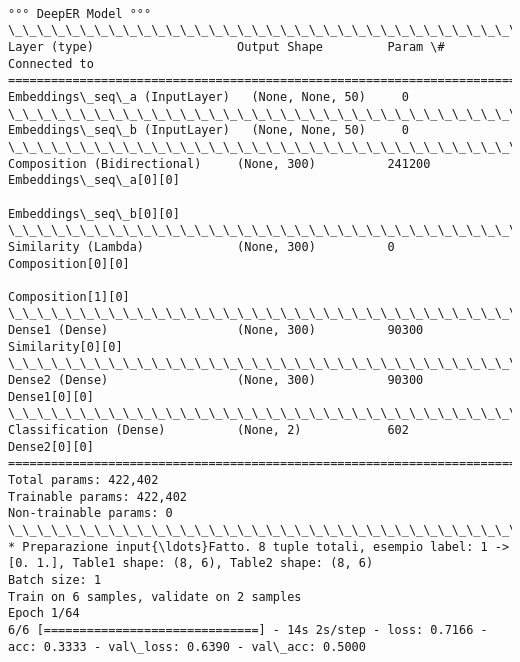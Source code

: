 \documentclass[11pt]{article}
\begin{document}
    \begin{Verbatim}[commandchars=\\\{\}]

°°° DeepER Model °°°
\_\_\_\_\_\_\_\_\_\_\_\_\_\_\_\_\_\_\_\_\_\_\_\_\_\_\_\_\_\_\_\_\_\_\_\_\_\_\_\_\_\_\_\_\_\_\_\_\_\_\_\_\_\_\_\_\_\_\_\_\_\_\_\_\_\_\_\_\_\_\_\_\_\_\_\_\_\_\_\_\_\_\_\_\_\_\_\_\_\_\_\_\_\_\_\_\_\_
Layer (type)                    Output Shape         Param \#     Connected to                     
==================================================================================================
Embeddings\_seq\_a (InputLayer)   (None, None, 50)     0                                            
\_\_\_\_\_\_\_\_\_\_\_\_\_\_\_\_\_\_\_\_\_\_\_\_\_\_\_\_\_\_\_\_\_\_\_\_\_\_\_\_\_\_\_\_\_\_\_\_\_\_\_\_\_\_\_\_\_\_\_\_\_\_\_\_\_\_\_\_\_\_\_\_\_\_\_\_\_\_\_\_\_\_\_\_\_\_\_\_\_\_\_\_\_\_\_\_\_\_
Embeddings\_seq\_b (InputLayer)   (None, None, 50)     0                                            
\_\_\_\_\_\_\_\_\_\_\_\_\_\_\_\_\_\_\_\_\_\_\_\_\_\_\_\_\_\_\_\_\_\_\_\_\_\_\_\_\_\_\_\_\_\_\_\_\_\_\_\_\_\_\_\_\_\_\_\_\_\_\_\_\_\_\_\_\_\_\_\_\_\_\_\_\_\_\_\_\_\_\_\_\_\_\_\_\_\_\_\_\_\_\_\_\_\_
Composition (Bidirectional)     (None, 300)          241200      Embeddings\_seq\_a[0][0]           
                                                                 Embeddings\_seq\_b[0][0]           
\_\_\_\_\_\_\_\_\_\_\_\_\_\_\_\_\_\_\_\_\_\_\_\_\_\_\_\_\_\_\_\_\_\_\_\_\_\_\_\_\_\_\_\_\_\_\_\_\_\_\_\_\_\_\_\_\_\_\_\_\_\_\_\_\_\_\_\_\_\_\_\_\_\_\_\_\_\_\_\_\_\_\_\_\_\_\_\_\_\_\_\_\_\_\_\_\_\_
Similarity (Lambda)             (None, 300)          0           Composition[0][0]                
                                                                 Composition[1][0]                
\_\_\_\_\_\_\_\_\_\_\_\_\_\_\_\_\_\_\_\_\_\_\_\_\_\_\_\_\_\_\_\_\_\_\_\_\_\_\_\_\_\_\_\_\_\_\_\_\_\_\_\_\_\_\_\_\_\_\_\_\_\_\_\_\_\_\_\_\_\_\_\_\_\_\_\_\_\_\_\_\_\_\_\_\_\_\_\_\_\_\_\_\_\_\_\_\_\_
Dense1 (Dense)                  (None, 300)          90300       Similarity[0][0]                 
\_\_\_\_\_\_\_\_\_\_\_\_\_\_\_\_\_\_\_\_\_\_\_\_\_\_\_\_\_\_\_\_\_\_\_\_\_\_\_\_\_\_\_\_\_\_\_\_\_\_\_\_\_\_\_\_\_\_\_\_\_\_\_\_\_\_\_\_\_\_\_\_\_\_\_\_\_\_\_\_\_\_\_\_\_\_\_\_\_\_\_\_\_\_\_\_\_\_
Dense2 (Dense)                  (None, 300)          90300       Dense1[0][0]                     
\_\_\_\_\_\_\_\_\_\_\_\_\_\_\_\_\_\_\_\_\_\_\_\_\_\_\_\_\_\_\_\_\_\_\_\_\_\_\_\_\_\_\_\_\_\_\_\_\_\_\_\_\_\_\_\_\_\_\_\_\_\_\_\_\_\_\_\_\_\_\_\_\_\_\_\_\_\_\_\_\_\_\_\_\_\_\_\_\_\_\_\_\_\_\_\_\_\_
Classification (Dense)          (None, 2)            602         Dense2[0][0]                     
==================================================================================================
Total params: 422,402
Trainable params: 422,402
Non-trainable params: 0
\_\_\_\_\_\_\_\_\_\_\_\_\_\_\_\_\_\_\_\_\_\_\_\_\_\_\_\_\_\_\_\_\_\_\_\_\_\_\_\_\_\_\_\_\_\_\_\_\_\_\_\_\_\_\_\_\_\_\_\_\_\_\_\_\_\_\_\_\_\_\_\_\_\_\_\_\_\_\_\_\_\_\_\_\_\_\_\_\_\_\_\_\_\_\_\_\_\_
* Preparazione input{\ldots}Fatto. 8 tuple totali, esempio label: 1 -> [0. 1.], Table1 shape: (8, 6), Table2 shape: (8, 6)
Batch size: 1
Train on 6 samples, validate on 2 samples
Epoch 1/64
6/6 [==============================] - 14s 2s/step - loss: 0.7166 - acc: 0.3333 - val\_loss: 0.6390 - val\_acc: 0.5000


\end{Verbatim}
\end{document}
